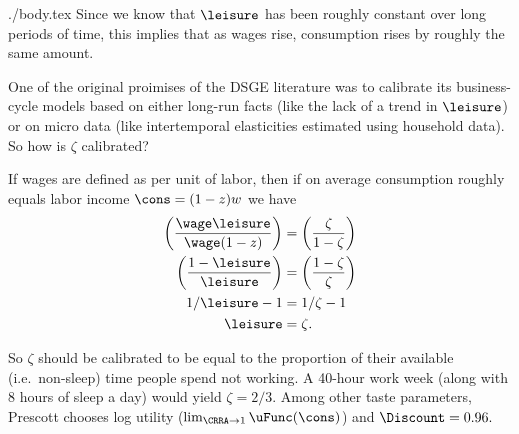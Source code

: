 \documentclass{handout}
\begin{document}
\begin{verbatimwrite}{./body.tex}
Since we know that $\leisure $ has been roughly constant over long periods 
of time, this implies that as wages rise, consumption rises by roughly 
the same amount.

One of the original proimises of the DSGE literature was to calibrate
its business-cycle models based on either long-run facts (like the lack
of a trend in $\leisure$) or on micro data (like intertemporal elasticities
estimated using household data).  So how is $\zeta$ calibrated?

If wages are defined as per unit of labor, then if on average consumption
roughly equals labor income $\cons = (1-z)w$ we have
\begin{equation}\begin{gathered}\begin{aligned}
        \left(\frac{\wage  \leisure}{\wage (1-z)}\right) & =  \left(\frac{\zeta}{1-\zeta}\right)  \\
        \left(\frac{1-\leisure}{\leisure }\right) & =  \left(\frac{1-\zeta}{\zeta}\right)  
\\      1/\leisure - 1 & =  1/\zeta - 1
\\  \leisure & =  \zeta     .
\end{aligned}\end{gathered}\end{equation}

So $\zeta$ should be calibrated to be equal to the proportion of their 
available (i.e.\  non-sleep) time people spend not working.  A 40-hour 
work week (along with 8 hours of sleep a day) would yield $\zeta = 
2/3$.  Among other taste parameters, Prescott chooses log utility
($\lim_{\CRRA \rightarrow 1}\uFunc(\cons)$) and $\Discount = 0.96.$


\end{verbatimwrite}
\end{document}

